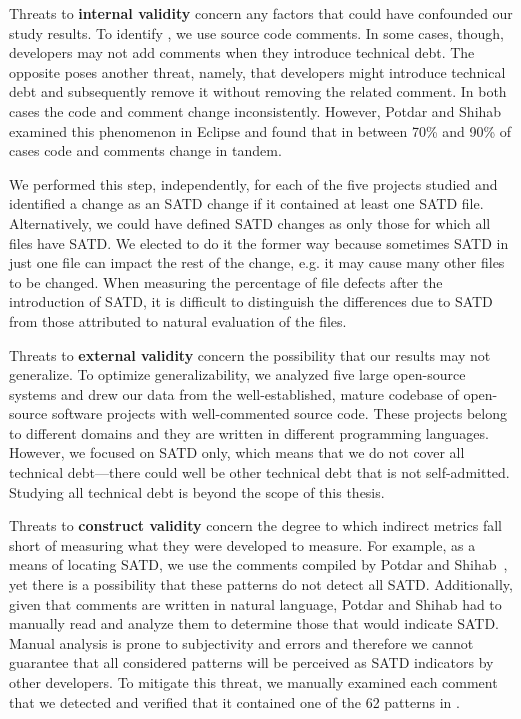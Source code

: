 Threats  to {\bf  internal validity}  concern any factors that could have confounded our study results. To identify \SATD, we use source code comments. In some cases, though, developers may not add comments when they introduce technical debt. The opposite poses another threat, namely, that developers might introduce technical debt and subsequently remove it without removing the related comment. In both cases the code and comment change inconsistently. However, Potdar and Shihab~\cite{ICSM_PotdarS14} examined this phenomenon in Eclipse and found that in between 70\% and 90\% of cases code and comments change in tandem.


We performed this step, independently, for each of the five projects studied and identified a change as an SATD change if it contained at least one SATD file. Alternatively, we could have defined SATD changes as only those for which all files have SATD. We elected to do it the former way because sometimes SATD in just one file can impact the rest of the change, e.g. it may cause many other files to be changed. When measuring the percentage of file defects after the introduction of SATD, it is difficult to distinguish the differences due to SATD from those attributed to natural evaluation of the files.



Threats  to {\bf external validity} concern the possibility that our results may not generalize. To optimize generalizability, we analyzed five large open-source systems and drew our data from the well-established, mature codebase of open-source software projects with well-commented source code. These projects belong to different domains and they are written in different programming languages. However, we focused on SATD only, which means that we do not cover all technical debt---there could well be other technical debt that is not self-admitted. Studying all technical debt is beyond the scope of this thesis.

Threats to {\textbf{construct validity}} concern the degree to which indirect metrics fall short of measuring what they were developed to measure. For example, as a means of locating SATD, we use the comments compiled by Potdar and Shihab~\cite{ICSM_PotdarS14}, yet there is a possibility that these patterns do not detect all SATD. Additionally, given that comments are written in natural language, Potdar and Shihab had to manually read and analyze them to determine those that would indicate SATD. Manual analysis is prone to subjectivity and errors and therefore we cannot guarantee that all considered patterns will be perceived as SATD indicators by other developers. To mitigate this threat, we manually examined each comment that we detected and verified that it contained one of the 62 patterns in \cite{ICSM_PotdarS14}. 



